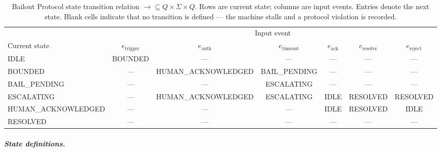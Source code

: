 \begin{table}[htbp]
\caption{Bailout Protocol state transition relation $\rightarrow \subseteq Q \times \Sigma \times Q$. Rows are current state; columns are input events. Entries denote the next state. Blank cells indicate that no transition is defined — the machine stalls and a protocol violation is recorded.}
\label{tab:transition-relation}
\begin{tabular}{@{}lcccccc@{}}
\toprule
 & \multicolumn{6}{c}{Input event} \\
\cmidrule(l){2-7}
Current state & $e_{\text{trigger}}$ & $e_{\text{auth}}$ & $e_{\text{timeout}}$ & $e_{\text{ack}}$ & $e_{\text{resolve}}$ & $e_{\text{reject}}$ \\
\midrule
IDLE & BOUNDED & — & — & — & — & — \\
BOUNDED & — & HUMAN\_ACKNOWLEDGED & BAIL\_PENDING & — & — & — \\
BAIL\_PENDING & — & — & ESCALATING & — & — & — \\
ESCALATING & — & HUMAN\_ACKNOWLEDGED & ESCALATING & IDLE & RESOLVED & RESOLVED \\
HUMAN\_ACKNOWLEDGED & — & — & — & IDLE & RESOLVED & IDLE \\
RESOLVED & — & — & — & — & — & — \\
\bottomrule
\end{tabular}
\end{table}

\subparagraph{State definitions.}


